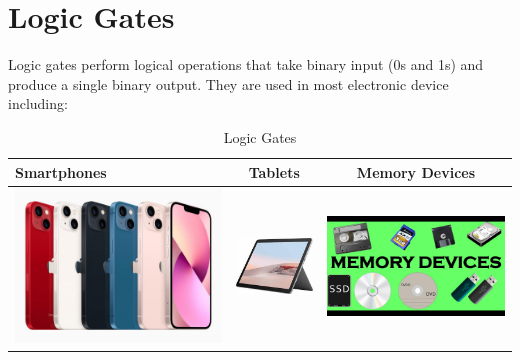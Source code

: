 \documentclass{article}
\begin{document}
	
\section{Logic Gates}	
Logic gates perform logical operations that take binary input (0s and 1s) and produce a single binary output. They are used in most electronic device including:

\begin{table}[h!]
	\begin{center}
		\caption{Logic Gates}
		\label{tab:table1}
		\begin{tabular}{|l|c|c|}
			\hline
			Smartphones
			&
			Tablets
			&
			Memory Devices
			\\
			\hline
			\includegraphics[width=0.2\linewidth]{Apple Phones.jpg}
			&
			\includegraphics[width=0.25\linewidth]{Tablets.jpg}
			&
			\includegraphics[width=0.2\linewidth]{Memory Devices.jpg}
			\\
			\hline			
			\end{tabular}
		\end{center}
	\end{table}
\end{document}
